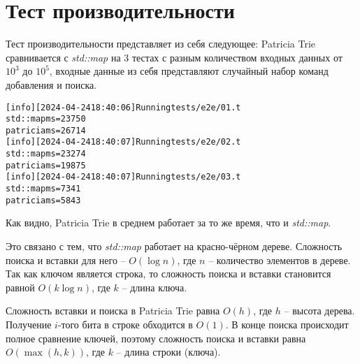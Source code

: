 \section{Тест производительности}

Тест производительности представляет из себя следующее: 
Patricia Trie сравнивается с \textit{std::map} на 3 тестах с разным количеством входных данных от $10^3$ до $10^5$, 
входные данные из себя представляют случайный набор команд добавления и поиска.

\begin{alltt}
[info] [2024-04-24 18:40:06] Running tests/e2e/01.t
std::map ms=23750
patricia ms=26714
[info] [2024-04-24 18:40:07] Running tests/e2e/02.t
std::map ms=23274
patricia ms=19875
[info] [2024-04-24 18:40:07] Running tests/e2e/03.t
std::map ms=7341
patricia ms=5843
\end{alltt}

Как видно, Patricia Trie в среднем работает за то же время, что и \textit{std::map}. 

Это связано с тем, что \textit{std::map} работает
на красно-чёрном дереве. Сложность поиска и вставки для него -- $O(\log n)$, где $n$ -- количество элементов в дереве. Так как ключом
является строка, то сложность поиска и вставки становится равной $O(k \log n)$, где $k$ -- длина ключа.

Сложность вставки и поиска в Patricia Trie равна $O(h)$, где $h$ -- высота дерева. Получение $i$-того бита в строке обходится в $O(1)$. 
В конце поиска происходит полное сравнение ключей, поэтому сложность поиска и вставки равна $O(\max (h, k))$, где $k$ -- длина строки (ключа).
\pagebreak
